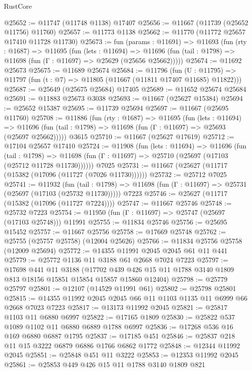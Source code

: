 \begin{lexlean}{RustCore}
\begin{coremodule}
@25652 := @11747 (@11748 @1138) @17407
@25656 := @11667 (@11739 (@25652 @11756) @11760)
@25657 := @11773 @1138
@25662 := @11770 (@11772 @25657 @17410 @11728 @11730)
@25673 := fun (params : @11691) =>
  @11693
    (fun (rty : @1687) =>
    @11695
      (fun (lets : @11694) =>
      @11696 (fun (tail : @1798) => @11698 (fun (Γ : @11697) => @25629 (@25656 @25662)))))
@25674 := @11692 @25673
@25675 := @11689 @25674
@25684 := @11796
    (fun (U : @11795) => @11797 (fun (t : @7) => @11805 (@11667 (@11811 @17407 @11685) @11822)))
@25687 := @25649 (@25675 @25684) @17405
@25689 := @11652 @25674 @25684
@25691 := @11883 @25673 @3038
@25693 := @11667 (@25627 @15384)
@25694 := @25652 @15387
@25695 := @11739 @25694
@25697 := @11667 (@25695 @11760)
@25708 := @11886
    (fun (rty : @1687) =>
    @11695
      (fun (lets : @11694) =>
      @11696 (fun (tail : @1798) => @11698 (fun (Γ : @11697) => @25693 (@25697 @25662)))))
    @3615
@25710 := @11667 (@25627 @17619)
@25712 := @17104 @25657 @17410
@25724 := @11908
    (fun (lets : @11694) =>
    @11696
      (fun (tail : @1798) =>
      @11698 (fun (Γ : @11697) => @25710 (@25697 (@17103 (@25712 @11728 @11730))))))
    @7025
@25731 := @11667 (@25627 (@11717 (@15382 (@17096 (@11727 (@7026 @11730))))))
@25732 := @25712 @7025
@25741 := @11932
    (fun (tail : @1798) => @11698 (fun (Γ : @11697) => @25731 (@25697 (@17103 (@25732 @11730)))))
    @7223
@25746 := @25627 (@11717 (@15382 (@17096 (@11727 @7224))))
@25747 := @11667 @25746
@25748 := @25732 @7223
@25754 := @11950 (fun (Γ : @11697) => @25747 (@25697 (@17103 @25748))) @11991
@25755 := @11834 @25746
@25756 := @25695 @15452
@25757 := @11667 @25756
@25758 := @17669 @25748
@25762 := @25755 (@25757 @25758) (@12004 @25626)
@25766 := @11834 @25756 @25758 (@12009 @25694)
@25772 := @14355 @11991 @2045 @2045 @61 @11 @441
@25779 := @25772 @1136 @11 @3188 @61 @2668 @7024 @7223
@25797 := @17698
    @441
    @11
    @3188
    (@17702 @439 @426 @15 @11 @1788 @3140 @1809 @813 @18156 @15851 @15854 @15857 @15860 @12404)
@25798 := @25779 @25797
@25801 := @12107 (@14529 @11991 @61)
@25802 := @25798 @25801
@25815 := @14355 @11992 @2045 @2045 @66 @11 @1103 @1135 @11 @6999 @66 @2668 @7023 @7223
@25817 := @13173 @11992 @2045
@25821 := @25817 @1103 @11 @6880 @6997
@25822 := @17165 @1809
@25830 := @25822 @537 @1089 @1102 @11 @6880 @6889 @1788 @6997
@25836 := @17268 @536 @16 @169 @6880 @6887 @1795
@25837 := @17185 @451
@25846 := @25837 @218 @11 @15 @3222 @6879 @6886 @1766 @6862 @1772
@25848 := @12344 @11992 @2045
@25851 := @25848 @451 @11 @3222
@25853 := @12353 @11992 @2045
@25861 := @25853 @449 @426 @15 @11 @1788 @3140 @1809 @821

\end{coremodule}
\end{lexlean}
